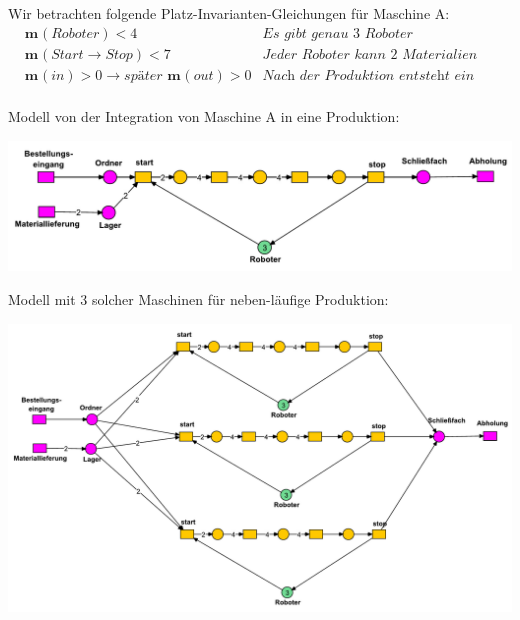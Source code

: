 \documentclass[12pt,a4paper]{../krautsourcing/homework}
\newcommand{\m}[1][]{\textbf{m}_{\textbf{#1}}}
\begin{document}
\newpage


\section{}

Wir betrachten folgende Platz-Invarianten-Gleichungen für Maschine A:
\begin{align*}
& \m (\textit{Roboter}) < 4 & \textit{Es gibt genau 3 Roboter} \\
& \m (\textit{Start} \to \textit{Stop}) < 7	         & \textit{Jeder Roboter kann 2 Materialien aufnehmen} \\
& \m (\textit{in}) > 0 \to \textit{später } \m(\textit{out}) > 0  & \textit{Nach der Produktion entsteht ein Produkt} \\
\end{align*}

Modell von der Integration von Maschine A in eine Produktion:

\centerline{
\includegraphics[scale=0.6]{aufgabe-8-6/8-6-1-integrationsmodell.pdf}
}

\vspace{10mm}

Modell mit 3 solcher Maschinen für neben-läufige Produktion:

\centerline{
\includegraphics[scale=0.5]{aufgabe-8-6/8-6-2-nebenlaeufige-produktion.pdf}
}
\end{document}
